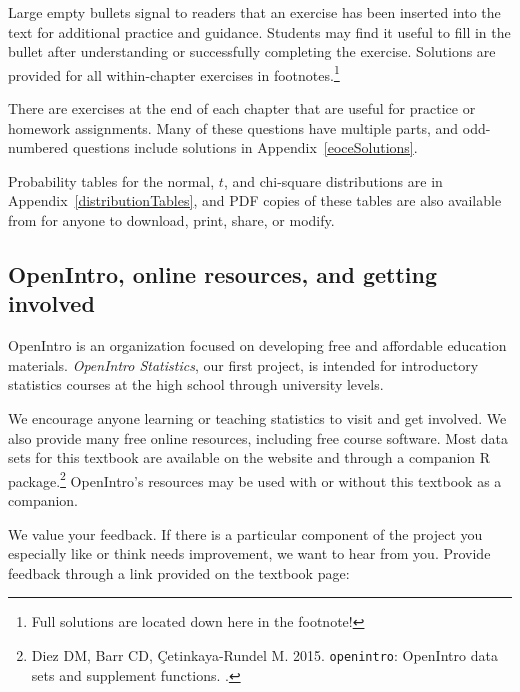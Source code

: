 \begin{exercise}
Large empty bullets signal to readers that an exercise has been inserted into the text for additional practice and guidance. Students may find it useful to fill in the bullet after understanding or successfully completing the exercise. Solutions are provided for all within-chapter exercises in footnotes.\footnote{Full solutions are located down here in the footnote!}
\end{exercise}

There are exercises at the end of each chapter that are useful for practice or homework assignments. Many of these questions have multiple parts, and odd-numbered questions include solutions in Appendix~\ref{eoceSolutions}.

Probability tables for the normal, $t$, and chi-square distributions are in Appendix~\ref{distributionTables}, and PDF copies of these tables are also available from  for anyone to download, print, share, or modify.


\subsection*{OpenIntro, online resources, and getting involved}

OpenIntro is an organization focused on developing free and affordable education materials. \emph{OpenIntro Statistics}, our first project, is intended for introductory statistics courses at the high school through university levels.

We encourage anyone learning or teaching statistics to visit  and get involved. We also provide many free online resources, including free course software. Most data sets for this textbook are available on the website and through a companion R package.\footnote{Diez DM, Barr CD, \c{C}etinkaya-Rundel M. 2015. \texttt{openintro}: OpenIntro data sets and supplement functions. .} OpenIntro's resources may be used with or without this textbook as a companion.

We value your feedback. If there is a particular component of the project you especially like or think needs improvement, we want to hear from you. Provide feedback through a link provided on the textbook page:
\begin{center}
\end{center}


